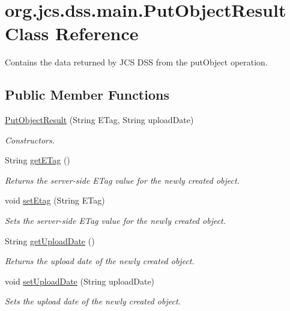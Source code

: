 \hypertarget{classorg_1_1jcs_1_1dss_1_1main_1_1PutObjectResult}{}\section{org.\+jcs.\+dss.\+main.\+Put\+Object\+Result Class Reference}
\label{classorg_1_1jcs_1_1dss_1_1main_1_1PutObjectResult}


Contains the data returned by J\+CS D\+SS from the put\+Object operation.  


\subsection*{Public Member Functions}
\begin{DoxyCompactItemize}
\item 
\hyperlink{classorg_1_1jcs_1_1dss_1_1main_1_1PutObjectResult_a03882a0a61bc0d86dfaf8bfa7b3488d3}{Put\+Object\+Result} (String E\+Tag, String upload\+Date)\hypertarget{classorg_1_1jcs_1_1dss_1_1main_1_1PutObjectResult_a03882a0a61bc0d86dfaf8bfa7b3488d3}{}\label{classorg_1_1jcs_1_1dss_1_1main_1_1PutObjectResult_a03882a0a61bc0d86dfaf8bfa7b3488d3}

\begin{DoxyCompactList}\small\item\em Constructors. \end{DoxyCompactList}\item 
String \hyperlink{classorg_1_1jcs_1_1dss_1_1main_1_1PutObjectResult_a46c6aa5e89b751e5ea637d0d6c99b533}{get\+E\+Tag} ()
\begin{DoxyCompactList}\small\item\em Returns the server-\/side E\+Tag value for the newly created object. \end{DoxyCompactList}\item 
void \hyperlink{classorg_1_1jcs_1_1dss_1_1main_1_1PutObjectResult_af24a189138659468dec9eb53bf6709ff}{set\+Etag} (String E\+Tag)
\begin{DoxyCompactList}\small\item\em Sets the server-\/side E\+Tag value for the newly created object. \end{DoxyCompactList}\item 
String \hyperlink{classorg_1_1jcs_1_1dss_1_1main_1_1PutObjectResult_a51fcf8cb1db8d4b9df3a0cac78305e92}{get\+Upload\+Date} ()
\begin{DoxyCompactList}\small\item\em Returns the upload date of the newly created object. \end{DoxyCompactList}\item 
void \hyperlink{classorg_1_1jcs_1_1dss_1_1main_1_1PutObjectResult_aeac0c4a35aa4a771363b995659bd5425}{set\+Upload\+Date} (String upload\+Date)
\begin{DoxyCompactList}\small\item\em Sets the upload date of the newly created object. \end{DoxyCompactList}\end{DoxyCompactItemize}


